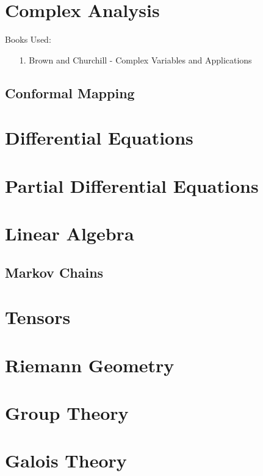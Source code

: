 \documentclass[12pt, english]{book}
\begin{document}
	\part{Complex Analysis}
	Books Used: 
	\begin{itemize}
		\item[1.] Brown and Churchill - Complex Variables and Applications \cite{Brown.J;Churchill.R-Complex-Variables-2014}
	\end{itemize}

	
	
	\chapter{Conformal Mapping}
	
	
	\part{Differential Equations}
	
	
	\part{Partial Differential Equations}
	
	
	\part{Linear Algebra}
	
	\chapter{Markov Chains}
	
	
	\part{Tensors}
	
	
	\part{Riemann Geometry}
	
	
	\part{Group Theory}
	
	
	\part{Galois Theory}
	
\end{document}
